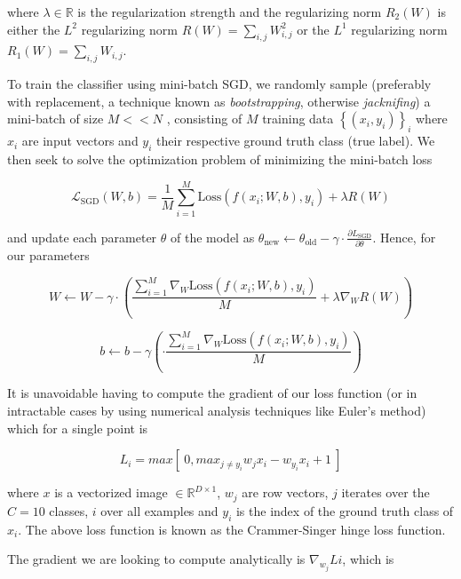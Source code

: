 \documentclass{article}
\begin{document}
    where $\lambda \in \mathbb{R}$ is the regularization strength and the regularizing norm $R_2(W)$ is either the $L^2$  regularizing norm $\displaystyle R(W) = \sum_{i,j} W_{i,j}^2$ or the $L^1$ regularizing norm $\displaystyle R_1(W) = \sum_{i,j} W_{i,j}$.
    
    To train the classifier using mini-batch SGD, we randomly sample (preferably with replacement, a technique known as \textit{bootstrapping}, otherwise \textit{jacknifing}) a mini-batch of size $M << N$ , consisting of $M$ training data $\left\{ (x_i, y_i)\right\}_{i}$ where $x_i$ are input vectors and $y_i$ their respective ground truth class (true label). We then seek to solve the optimization problem of minimizing the mini-batch loss 
    
    $$\mathcal{L}_{\text{SGD}}(W,b) = \frac{1}{M} \sum_{i=1}^{M} \text{Loss}(f(x_i;W,b),y_i) + \lambda R(W)$$
      
    and update each parameter $\theta$ of the model as $\theta_{\text{new}} \leftarrow \theta_{\text{old}} - \gamma \cdot \frac{\partial L_\text{SGD}}{\partial \theta} $. Hence, for our parameters
    
    $$\displaystyle W \leftarrow W - \gamma \cdot \left( \frac{\sum_{i=1}^{M} \nabla_W \text{Loss}(f(x_i;W,b),y_i)}{M} + \lambda \nabla_W R(W) \right) $$
    
    $$\displaystyle b \leftarrow b - \gamma \left( \cdot \frac{\sum_{i=1}^{M} \nabla_W \text{Loss}(f(x_i;W,b),y_i)}{M} \right) $$
    
    It is unavoidable having to compute the gradient of our loss function (or in intractable cases by using numerical analysis techniques like Euler's method) which for a single point is 
   
    $$\displaystyle L_i = max [\ 0, max_{j \neq y_i}w_j x_i - w_{y_i}x_i + 1\ ]$$
    
    where $x$ is a vectorized image $\in \mathbb{R}^{D \times 1}$, $w_j$ are row vectors, $j$ iterates over the $C=10$ classes, $i$ over all examples and $y_i$ is the index of the ground truth class of $x_i$. The above loss function is known as the Crammer-Singer hinge loss function. 
    
    
    
    The gradient we are looking to compute analytically is $ \nabla_{w_{j}}Li$, which is
    
\end{document}
